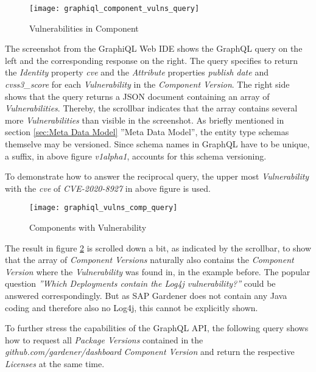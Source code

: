 \begin{figure}[H]
	\centering
	\texttt{[image: graphiql\_component\_vulns\_query]}
	\caption[GraphQL Query Vulnerabilities in Component]{Vulnerabilities in Component }
	\label{fig:VulnsInComp}
\end{figure}

The screenshot from the GraphiQL Web IDE shows the GraphQL query on the left and the corresponding response on the right. The query specifies to return the \emph{Identity} property \emph{cve} and the \emph{Attribute} properties \emph{publish date} and \emph{cvss3\_score} for each \emph{Vulnerability} in the \emph{Component Version}. The right side shows that the query returns a JSON document containing an array of \emph{Vulnerabilities}. Thereby, the scrollbar indicates that the array contains several more \emph{Vulnerabilities} than visible in the screenshot. As briefly mentioned in section \ref{sec:Meta Data Model} ''Meta Data Model'', the entity type schemas themselve may be versioned. Since schema names in GraphQL have to be unique, a suffix, in above figure \emph{v1alpha1}, accounts for this schema versioning.\par 
To demonstrate how to answer the reciprocal query, the upper most \emph{Vulnerability} with the \emph{cve} of \emph{CVE-2020-8927} in above figure is used. 

\begin{figure}[H]
	\centering
	\texttt{[image: graphiql\_vulns\_comp\_query]}
	\caption[GraphQL Query Components with Vulnerability]{Components with Vulnerability }
	\label{fig:CompsWithVuln}
\end{figure}

The result in figure \ref{fig:CompsWithVuln} is scrolled down a bit, as indicated by the scrollbar, to show that the array of \emph{Component Versions} naturally also contains the \emph{Component Version} where the \emph{Vulnerability} was found in, in the example before. The popular question \emph{''Which Deployments contain the Log4j vulnerability?''} could be answered correspondingly. But as SAP Gardener does not contain any Java coding and therefore also no Log4j, this cannot be explicitly shown.\par
To further stress the capabilities of the GraphQL API, the following query shows how to request all \emph{Package Versions} contained in the \emph{github.com/gardener/dashboard} \emph{Component Version} and return the respective \emph{Licenses} at the same time.

